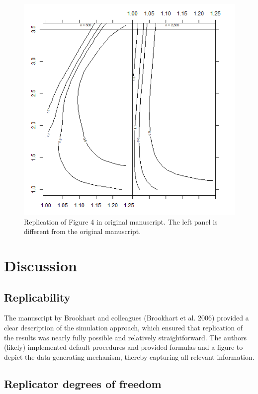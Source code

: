 \documentclass[10,a4paperpaper,]{article}
\begin{document}
\begin{figure}
\includegraphics[width=450pt]{../../figures/Figure4} \caption{Replication of Figure 4 in original manuscript. The left panel is different from the original manuscript.}\label{fig:unnamed-chunk-3}
\end{figure}

\FloatBarrier
\section{Discussion}

\subsection{Replicability}

The manuscript by Brookhart and colleagues (Brookhart et al. 2006)
provided a clear description of the simulation approach, which ensured
that replication of the results was nearly fully possible and relatively
straightforward. The authors (likely) implemented default procedures and
provided formulas and a figure to depict the data-generating mechanism,
thereby capturing all relevant information.

\subsection{Replicator degrees of freedom}
\end{document}
